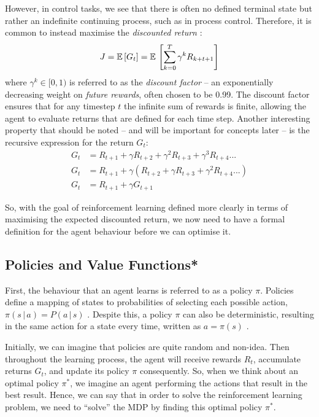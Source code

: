 However, in control tasks, we see that there is often no defined terminal state but rather an indefinite continuing process, such as in process control. Therefore, it is common to instead maximise the \textit{discounted return} \cite{suttonAndBartoBook}:
\begin{equation}
    J = \mathbb{E} \, [G_t] = \mathbb{E} \, \left[ 
    \sum^{T}_{k = 0} \gamma^{k} R_{k+t+1}
    \right]
\end{equation}
where $\gamma^k \in [0, 1)$ is referred to as the \textit{discount factor} -- an exponentially decreasing weight on \textit{future rewards}, often chosen to be 0.99. The discount factor ensures that for any timestep $t$ the infinite sum of rewards is finite, allowing the agent to evaluate returns that are defined for each time step.
Another interesting property that should be noted -- and will be important for concepts later -- is the recursive expression for the return $G_t$:
\begin{align}
    G_t &= R_{t+1} + \gamma R_{t+2} + \gamma^2 R_{t+3} + \gamma^3 R_{t+4} ... \nonumber \\
    G_t &= R_{t+1} + \gamma (R_{t+2} + \gamma R_{t+3} + \gamma^2 R_{t+4} ...) \nonumber \\
    G_t &= R_{t+1} + \gamma G_{t+1} \label{eq:2_recursive_returns} 
\end{align}

So, with the goal of reinforcement learning defined more clearly in terms of maximising the expected discounted return, we now need to have a formal definition for the agent behaviour before we can optimise it.

\subsection{Policies and Value Functions*}
\label{subsec:2_policies_and_value_funcs}

First, the behaviour that an agent learns is referred to as a policy $\pi$. Policies define a mapping of states to probabilities of selecting each possible action, $\pi(s \,|\, a) = P(a\,|\,s)$ \cite{suttonAndBartoBook}. Despite this, a policy $\pi$ can also be deterministic, resulting in the same action for a state every time, written as $a = \pi(s)$ \cite{RLinRoboticsSurvey}.


Initially, we can imagine that policies are quite random and non-idea. Then throughout the learning process, the agent will receive rewards $R_t$, accumulate returns $G_t$, and update its policy $\pi$ consequently. So, when we think about an optimal policy $\pi^*$, we imagine an agent performing the actions that result in the best result.
Hence, we can say that in order to solve the reinforcement learning problem, we need to ``solve'' the MDP by finding this optimal policy $\pi^*$.

